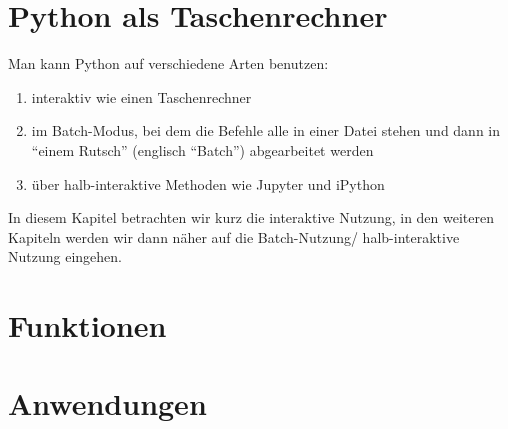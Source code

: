 \documentclass[12pt,ngerman]{scrreprt}
\begin{document}
\chapter{Python als Taschenrechner}

Man kann Python auf verschiedene Arten benutzen:

\begin{enumerate}
\item interaktiv wie einen Taschenrechner
\item im Batch-Modus, bei dem die Befehle alle in einer Datei stehen und dann in \enquote{einem Rutsch} (englisch \enquote{Batch}) abgearbeitet werden
\item über halb-interaktive Methoden wie Jupyter und iPython
\end{enumerate}

In diesem Kapitel betrachten wir kurz die interaktive Nutzung, in den weiteren Kapiteln werden wir dann näher auf die Batch-Nutzung/ halb-interaktive Nutzung eingehen.

\chapter{Funktionen}

\chapter{Anwendungen}
\end{document}
